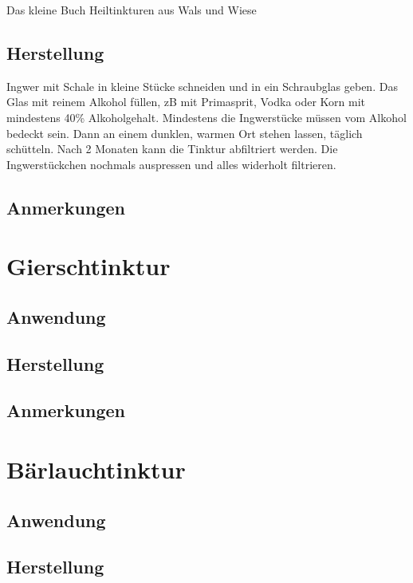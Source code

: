 \cite{celticingwer}
Das kleine Buch Heiltinkturen aus Wals und Wiese


\subsection{Herstellung}

Ingwer mit Schale in kleine Stücke schneiden und in ein Schraubglas geben. Das Glas mit reinem Alkohol füllen, zB mit Primasprit, Vodka oder Korn mit mindestens 40\% Alkoholgehalt. Mindestens die Ingwerstücke müssen vom Alkohol bedeckt sein. Dann an einem dunklen, warmen Ort stehen lassen, täglich schütteln. Nach 2 Monaten kann die Tinktur abfiltriert werden. Die Ingwerstückchen nochmals auspressen und alles widerholt filtrieren.

\subsection{Anmerkungen}




\section{Gierschtinktur}

\subsection{Anwendung}

\subsection{Herstellung}

\subsection{Anmerkungen}





\section{Bärlauchtinktur}

\subsection{Anwendung}

\subsection{Herstellung}

